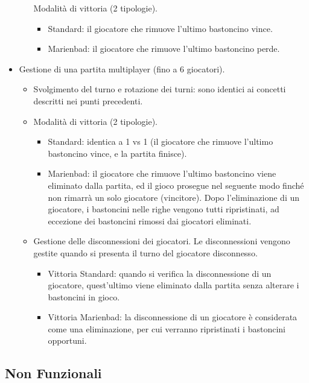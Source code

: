 \begin{itemize}
\begin{itemize}
		Modalità di vittoria (2 tipologie).
		\begin{itemize}
		\item
			Standard: il giocatore che rimuove l'ultimo bastoncino vince.
		\item
			Marienbad: il giocatore che rimuove l'ultimo bastoncino perde.
		\end{itemize}
	\end{itemize}
\item
	Gestione di una partita multiplayer (fino a 6 giocatori).
	\begin{itemize}
	\item
		Svolgimento del turno e rotazione dei turni: sono identici ai concetti descritti nei punti precedenti.
	\item
		Modalità di vittoria (2 tipologie).
		\begin{itemize}
		\item
			Standard: identica a 1 vs 1 (il giocatore che rimuove l'ultimo bastoncino vince, e la partita finisce).
		\item
			Marienbad: il giocatore che rimuove l'ultimo bastoncino viene eliminato dalla partita, ed il gioco prosegue nel seguente modo finché non rimarrà un solo giocatore (vincitore). Dopo l'eliminazione di un giocatore, i bastoncini nelle righe vengono tutti ripristinati, ad eccezione dei bastoncini rimossi dai giocatori eliminati.
		\end{itemize}
	
	\newpage
	
	\item
		Gestione delle disconnessioni dei giocatori. Le disconnessioni vengono gestite quando si presenta il turno del giocatore disconnesso.
		\begin{itemize}
		\item
			Vittoria Standard: quando si verifica la disconnessione di un giocatore, quest'ultimo viene eliminato dalla partita senza alterare i bastoncini in gioco.
		\item
			Vittoria Marienbad: la disconnessione di un giocatore è considerata come una eliminazione, per cui verranno ripristinati i bastoncini opportuni.
		\end{itemize}
	\end{itemize}
\end{itemize}

\subsection{Non Funzionali}

